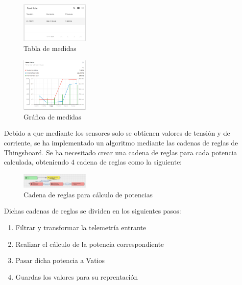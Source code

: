 \begin{figure}[H]
    \centering
    \includegraphics[width=0.3\textwidth]{images/3-software/3-2-2-thingsboard/TablaThingsBoard.png}
    \caption{Tabla de medidas}
    \label{fig:3-2-2-TablaThingsBoard}
\end{figure}

\begin{figure}[H]
    \centering
    \includegraphics[width=0.3\textwidth]{images/3-software/3-2-2-thingsboard/GraficaThingsBoard.png}
    \caption{Gráfica de medidas}
    \label{fig:3-2-2-GraficaThingsBoard}
\end{figure}

Debido a que mediante los sensores solo se obtienen valores de tensión y de corriente, se ha implementado un algoritmo mediante las cadenas de reglas de Thingsboard. Se ha necesitado crear una cadena de reglas para cada potencia calculada, obteniendo 4 cadena de reglas como la siguiente:

\begin{figure}[H]
    \centering
    \includegraphics[width=0.3\textwidth]{images/3-software/3-2-2-thingsboard/CadenaPotencia.png}
    \caption{Cadena de reglas para cálculo de potencias}
    \label{fig:3-2-2-CadenaPotenciaThingsBoard}
\end{figure}

Dichas cadenas de reglas se dividen en los siguientes pasos:

\begin{enumerate}
    \item Filtrar y transformar la telemetría entrante
    \item Realizar el cálculo de la potencia correspondiente
    \item Pasar dicha potencia a Vatios
    \item Guardas los valores para su reprentación
\end{enumerate}

